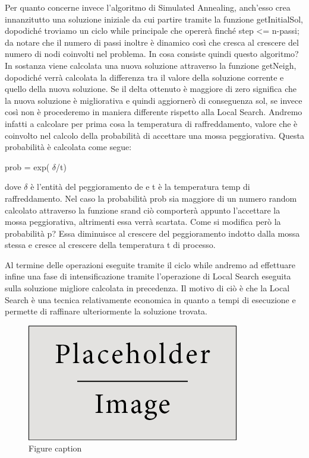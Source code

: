 \documentclass[preprint,12pt]{elsarticle}
\begin{document}
Per quanto concerne invece l'algoritmo di Simulated Annealing, anch'esso crea innanzitutto una soluzione iniziale da cui partire tramite la funzione getInitialSol, dopodiché troviamo un ciclo while principale che opererà finché step <= n-passi; da notare che il numero di passi inoltre è dinamico così che cresca al crescere del numero di nodi coinvolti nel problema. In cosa consiste quindi questo algoritmo? In sostanza viene calcolata una nuova soluzione attraverso la funzione getNeigh, dopodiché verrà calcolata la differenza tra il valore della soluzione corrente e quello della nuova soluzione. Se il delta ottenuto è maggiore di zero significa che la nuova soluzione è migliorativa e quindi aggiornerò di conseguenza sol, se invece così non è procederemo in maniera differente rispetto alla Local Search. Andremo infatti a calcolare per prima cosa la temperatura di raffreddamento, valore che è coinvolto nel calcolo della probabilità di accettare una mossa peggiorativa. Questa probabilità è calcolata come segue:

\begin{center}
prob = exp( $\delta$/t)
\end{center}

dove $\delta$ è l'entità del peggioramento de e t è la temperatura temp di raffreddamento. Nel caso la probabilità prob sia maggiore di un numero random calcolato attraverso la funzione srand ciò comporterà appunto l'accettare la mossa peggiorativa, altrimenti essa verrà scartata. Come si modifica però la probabilità p? Essa diminuisce al crescere del peggioramento indotto dalla mossa stessa e cresce al crescere della temperatura t di processo.

Al termine delle operazioni eseguite tramite il ciclo while andremo ad effettuare infine una fase di intensificazione tramite l'operazione di Local Search eseguita sulla soluzione migliore calcolata in precedenza. Il motivo di ciò è che la Local Search è una tecnica relativamente economica in quanto a tempi di esecuzione e permette di raffinare ulteriormente la soluzione trovata.


\begin{figure}[h]
\centering\includegraphics[width=0.4\linewidth]{placeholder}
\caption{Figure caption}
\end{figure}
\end{document}
